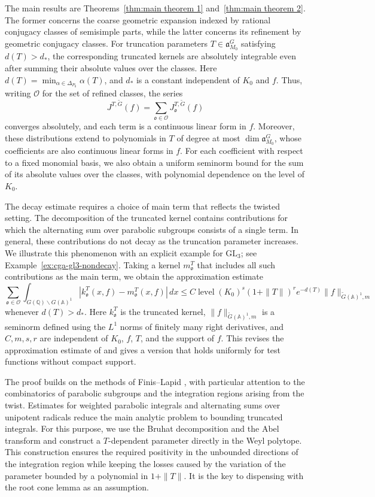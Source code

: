 \documentclass[12pt]{amsart}
\theoremstyle{definition}
\theoremstyle{plain}
\theoremstyle{remark}
\def\Q{\mathbb{Q}}%
\def\A{\mathbb{A}}%
\newcommand{\fa}{\mathfrak{a}}
\newcommand{\fo}{\mathfrak{o}}
\newcommand{\cO}{\mathcal{O}}
\numberwithin{equation}{section}
\newcommand{\tG}{\widetilde{G}}
\begin{document}
The main results are Theorems~\ref{thm:main theorem 1} and~\ref{thm:main theorem 2}.
The former concerns the coarse geometric expansion indexed by rational conjugacy classes of semisimple parts, while the latter concerns its refinement by geometric conjugacy classes.
For truncation parameters $T\in\fa_{M_0}^G$ satisfying $d(T)>d_*$, the corresponding truncated kernels are
absolutely integrable even after summing their absolute values over the classes.
Here
$d(T)=\min_{\alpha\in\Delta_{P_0}}\alpha(T)$,
and $d_*$ is a constant independent of $K_0$ and $f$.
Thus, writing $\cO$ for the set of refined classes, the series
\[
 J^{T,\tG}(f)=\sum_{\fo\in\cO}J_{\fo}^{T,\tG}(f)
\]
converges absolutely, and each term is a continuous linear form in $f$.
Moreover, these distributions extend to polynomials in $T$ of degree at most $\dim\fa_{M_0}^G$, whose coefficients
are also continuous linear forms in $f$.
For each coefficient with respect to a fixed monomial basis, we also obtain a uniform seminorm bound for the sum of its
absolute values over the classes, with polynomial dependence on the level of $K_0$.


The decay estimate requires a choice of main term that reflects the twisted setting.
The decomposition of the truncated kernel contains contributions for which the alternating sum over parabolic
subgroups consists of a single term.
In general, these contributions do not decay as the truncation parameter increases.
We illustrate this phenomenon with an explicit example for $\mathrm{GL}_3$; see Example~\ref{ex:cga-gl3-nondecay}.
Taking a kernel $m_{\fo}^T$ that includes all such contributions as the main term, we obtain the approximation estimate
\[
 \sum_{\fo\in\cO}
 \int_{G(\Q)\backslash G(\A)^1}
   |k_{\fo}^T(x,f)-m_{\fo}^T(x,f)|\,dx \le
 C\operatorname{level}(K_0)^s
 (1+\|T\|)^r e^{-d(T)}
 \|f\|_{\tG(\A)^1,m}
\]
whenever $d(T)>d_*$.
Here $k_{\fo}^T$ is the truncated kernel, $\|f\|_{\tG(\A)^1,m}$ is a seminorm defined using the $L^1$ norms of finitely many right derivatives, and $C,m,s,r$ are independent of $K_0$, $f$, $T$, and the support of $f$.
This revises the approximation estimate of \cite{Par19} and gives a version that holds uniformly for test functions
without compact support.


The proof builds on the methods of Finis--Lapid \cites{FL11semi,FL16}, with particular attention to the combinatorics of parabolic subgroups and the integration regions arising from the twist.
Estimates for weighted parabolic integrals and alternating sums over unipotent radicals reduce the main analytic problem
to bounding truncated integrals.
For this purpose, we use the Bruhat decomposition and the Abel transform and construct a $T$-dependent parameter
directly in the Weyl polytope.
This construction ensures the required positivity in the unbounded directions of the integration region while keeping
the losses caused by the variation of the parameter bounded by a polynomial in $1+\|T\|$.
It is the key to dispensing with the root cone lemma as an assumption.
\end{document}
